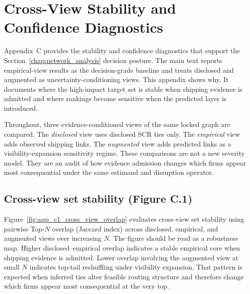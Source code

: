 \chapter{Cross-View Stability and Confidence Diagnostics}
\label{app:cross_view_stability_confidence}

Appendix~C provides the stability and confidence diagnostics that support the Section~\ref{chap:network_analysis} decision posture. The main text reports empirical-view results as the decision-grade baseline and treats disclosed and augmented as uncertainty-conditioning views. This appendix shows why. It documents where the high-impact target set is stable when shipping evidence is admitted and where rankings become sensitive when the predicted layer is introduced.

Throughout, three evidence-conditioned views of the same locked graph are compared. The \textit{disclosed} view uses disclosed SCR ties only. The \textit{empirical} view adds observed shipping links. The \textit{augmented} view adds predicted links as a visibility-expansion sensitivity regime. These comparisons are not a new severity model. They are an audit of how evidence admission changes which firms appear most consequential under the same estimand and disruption operator.

\section{Cross-view set stability (Figure C.1)}
\label{app:c1_cross_view_stability}

Figure~\ref{fig:app_c1_cross_view_overlap} evaluates cross-view set stability using pairwise Top-$N$ overlap (Jaccard index) across disclosed, empirical, and augmented views over increasing $N$. The figure should be read as a robustness map. Higher disclosed--empirical overlap indicates a stable empirical core when shipping evidence is admitted. Lower overlap involving the augmented view at small $N$ indicates top-tail reshuffling under visibility expansion. That pattern is expected when inferred ties alter feasible routing structure and therefore change which firms appear most consequential at the very top.

